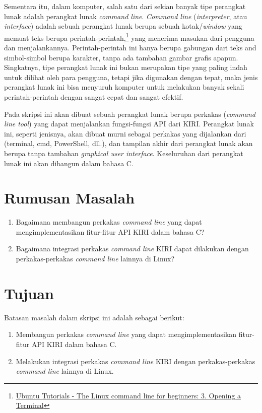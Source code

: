\documentclass[a4paper,twoside]{article}
\begin{document}
\vfill\newpage
Sementara itu, dalam komputer, salah satu dari sekian banyak tipe perangkat lunak adalah perangkat lunak \textit{command line}. \textit{\mbox{Command} line} (\cl \textit{interpreter}, atau \cl \textit{interface}) adalah sebuah perangkat lunak berupa sebuah kotak/\textit{window} yang memuat teks berupa perintah-perintah,\footnote{\href{https://ubuntu.com/tutorials/command-line-for-beginners\#3-opening-a-terminal}{Ubuntu Tutorials - The Linux command line for beginners: 3. Opening a Terminal}} yang menerima masukan dari pengguna dan  menjalankannya.\cite{marsh:2010:fatfreeintrotocommandline} Perintah-perintah ini hanya berupa gabungan dari teks and simbol-simbol berupa karakter, tanpa ada tambahan gambar grafis apapun. Singkatnya, tipe perangkat lunak ini bukan merupakan tipe yang paling indah untuk dilihat oleh para pengguna, tetapi jika digunakan dengan tepat, maka \mbox{jenis} \mbox{perangkat} lunak ini bisa menyuruh komputer untuk melakukan banyak sekali perintah-perintah dengan sangat cepat dan sangat efektif.

Pada skripsi ini akan dibuat sebuah perangkat lunak berupa perkakas \cl (\textit{command line tool}) yang dapat menjalankan fungsi-fungsi API dari KIRI. Perangkat lunak ini, seperti jenisnya, akan dibuat murni sebagai perkakas yang dijalankan dari \cl (terminal, cmd, PowerShell, dll.), dan tampilan akhir dari perangkat lunak akan berupa \cli tanpa tambahan \textit{graphical user interface}. Keseluruhan dari perangkat lunak ini akan dibangun dalam bahasa C.

\section{Rumusan Masalah}
\label{sec:rumusan}
\begin{enumerate}
	\item Bagaimana membangun perkakas \textit{command line} yang dapat mengimplementasikan fitur-fitur API KIRI dalam bahasa C?
	\item Bagaimana integrasi perkakas \textit{command line} KIRI dapat dilakukan dengan perkakas-perkakas \textit{command line} lainnya di Linux?
\end{enumerate}

\section{Tujuan}
\label{sec:tujuan}
Batasan masalah dalam skripsi ini adalah sebagai berikut:
\begin{enumerate}
	\item Membangun perkakas \textit{command line} yang dapat mengimplementasikan fitur-fitur API KIRI dalam bahasa C.
	\item Melakukan integrasi perkakas \textit{command line} KIRI dengan perkakas-perkakas \textit{command line} lainnya di Linux.
\end{enumerate}
\end{document}
